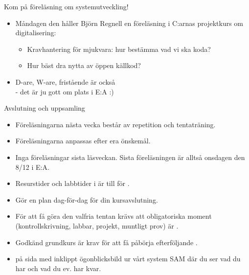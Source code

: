 \begin{SlideExtra}{Kom på föreläsning om systemutveckling!}
\begin{itemize}
  \item Måndagen den  håller Björn Regnell en föreläsning i C:arnas projektkurs om digitalisering: 
\begin{itemize}
  \item Kravhantering för mjukvara: hur bestämma vad vi ska koda?
  \item Hur bäst dra nytta av öppen källkod?
\end{itemize}
  \item D-are, W-are, fristående är också  \\ - det är ju gott om plats i E:A :)
\end{itemize}
  
\end{SlideExtra}



\begin{SlideExtra}{Avslutning och uppsamling}

\begin{itemize}\SlideFontSmall

\item Föreläsningarna nästa vecka består av repetition och tentaträning.

\item Föreläsningarna anpassas efter era önskemål. %

\item Inga föreläsningar sista läsveckan. Sista föreläsningen är alltså onsdagen den 8/12 i E:A.

\item Resurstider och labbtider i  är till för .

\item Gör en  plan dag-för-dag för din kursavslutning.

\item För att få göra den valfria tentan krävs att  obligatoriska moment (kontrollskrivning, labbar, projekt, muntligt prov) är . 

\item Godkänd grundkurs är krav för att få påbörja efterföljande .

\item {} på sida med inklippt ögonblicksbild ur vårt system SAM där du ser vad du har  och vad du ev. har kvar.

\end{itemize}

\end{SlideExtra}

